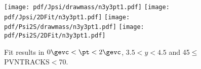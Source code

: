 \begin{figure}[H]
\begin{center}
\texttt{[image: pdf/Jpsi/drawmass/n3y3pt1.pdf]}
\texttt{[image: pdf/Jpsi/2DFit/n3y3pt1.pdf]}
\vspace*{-0.5cm}
\texttt{[image: pdf/Psi2S/drawmass/n3y3pt1.pdf]}
\texttt{[image: pdf/Psi2S/2DFit/n3y3pt1.pdf]}
\vspace*{-0.5cm}
\end{center}
\caption{Fit results in $0\gevc<\pt<2\gevc$, $3.5<y<4.5$ and 45$\leq$PVNTRACKS$<$70.}
\label{Fitn3y3pt1}
\end{figure}

